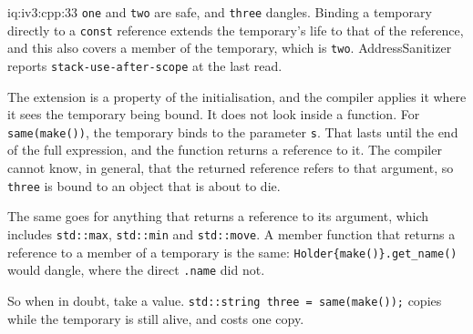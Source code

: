 \begin{solution}{iq:iv3:cpp:33}
\texttt{one} and \texttt{two} are safe, and \texttt{three} dangles. Binding a temporary directly to a \texttt{const} reference extends the temporary's life to that of the reference, and this also covers a member of the temporary, which is \texttt{two}. AddressSanitizer reports \texttt{stack-use-after-scope} at the last read.

The extension is a property of the initialisation, and the compiler applies it where it sees the temporary being bound. It does not look inside a function. For \texttt{same(make())}, the temporary binds to the parameter \texttt{s}. That lasts until the end of the full expression, and the function returns a reference to it. The compiler cannot know, in general, that the returned reference refers to that argument, so \texttt{three} is bound to an object that is about to die.

The same goes for anything that returns a reference to its argument, which includes \texttt{std::max}, \texttt{std::min} and \texttt{std::move}. A member function that returns a reference to a member of a temporary is the same: \texttt{Holder\{make()\}.get\_name()} would dangle, where the direct \texttt{.name} did not.

So when in doubt, take a value. \texttt{std::string three = same(make());} copies while the temporary is still alive, and costs one copy.

\end{solution}

